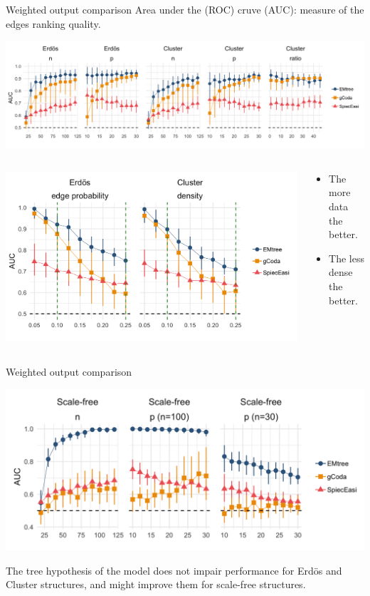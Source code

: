 \documentclass[11pt]{beamer}
\newcommand{\bleu}[1]{\textcolor{Framableulight}{#1}}
\begin{document}
   \begin{frame}{Weighted output comparison}
   \bleu{Area under the (ROC) cruve (AUC)}: measure of the edges ranking quality.
 \begin{center}
  \includegraphics[width=\linewidth]{images/panel_npfav.png}
   \end{center}
  \begin{columns}
  \begin{column}{0.5\linewidth}
  \includegraphics[width=\linewidth]{images/panel_dens_seuils.png} 
  \end{column}
    \begin{column}{0.5\linewidth}
   \begin{itemize}
 \item The more data the better.
 \item The less dense the better.
 \end{itemize}
   \end{column}
   \end{columns}

 \end{frame}
 
 \begin{frame}{Weighted output comparison}
 \begin{center}
  \includegraphics[width=0.7\linewidth]{images/scalef_auc.png}
 \end{center}
 The tree hypothesis of the model does not impair performance for Erdös and Cluster structures, and might improve them for scale-free structures.
 \end{frame}
 
\end{document}
